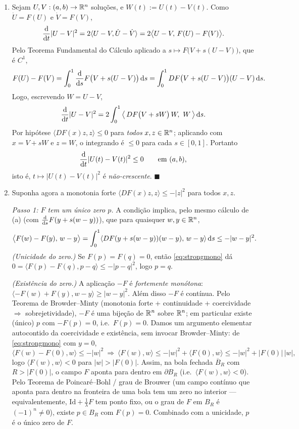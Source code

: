 \begin{enumerate}[label=(\alph*)]

\item Sejam $U,V:(a,b)\to\mathbb{R}^n$ soluções, e $W(t):=U(t)-V(t)$. Como $\dot U=F(U)$ e $\dot V=F(V)$,
\[
\frac{\mathrm{d}}{\mathrm{d} t}|U-V|^2=2\langle U-V,\dot U-\dot V\rangle=2\big\langle U-V,\,F(U)-F(V)\big\rangle .
\]
Pelo Teorema Fundamental do Cálculo aplicado a $s\mapsto F\big(V+s(U-V)\big)$, que é $C^1$,
\[
F(U)-F(V)=\int_0^1 \frac{\mathrm{d}}{\mathrm{d} s}F\big(V+s(U-V)\big)\,\mathrm{d} s=\int_0^1 DF\big(V+s(U-V)\big)(U-V)\,\mathrm{d} s .
\]
Logo, escrevendo $W=U-V$,
\[
\frac{\mathrm{d}}{\mathrm{d} t}|U-V|^2=2\int_0^1 \big\langle\, DF\big(V+sW\big)\,W,\ W\,\big\rangle\,\mathrm{d} s .
\]
Por hipótese $\langle DF(x)z,z\rangle\le0$ para \emph{todos} $x,z\in\mathbb{R}^n$; aplicando com $x=V+sW$ e $z=W$, o integrando é $\le0$ para cada $s\in[0,1]$. Portanto
\[
\frac{\mathrm{d}}{\mathrm{d} t}|U(t)-V(t)|^2\le0\qquad\text{em }(a,b),
\]
isto é, $t\mapsto|U(t)-V(t)|^2$ é \emph{não-crescente}. \qquad$\blacksquare$

\item Suponha agora a monotonia forte $\langle DF(x)z,z\rangle\le-|z|^2$ para todos $x,z$.

\emph{Passo 1: $F$ tem um único zero $p$.}
A condição implica, pelo mesmo cálculo de (a) (com $\frac{\mathrm{d}}{\mathrm{d} s}F(y+s(w-y))$), que para quaisquer $w,y\in\mathbb{R}^n$,
\begin{equation}\label{eq:strongmono}
\big\langle F(w)-F(y),\,w-y\big\rangle=\int_0^1\langle DF(y+s(w-y))(w-y),\,w-y\rangle\,\mathrm{d} s\le -|w-y|^2 .
\end{equation}
\emph{(Unicidade do zero.)} Se $F(p)=F(q)=0$, então \eqref{eq:strongmono} dá $0=\langle F(p)-F(q),p-q\rangle\le -|p-q|^2$, logo $p=q$.

\emph{(Existência do zero.)} A aplicação $-F$ é \emph{fortemente monótona}: $\langle -F(w)+F(y),w-y\rangle\ge|w-y|^2$. Além disso $-F$ é contínua. Pelo Teorema de Browder--Minty (monotonia forte + continuidade + coercividade $\Rightarrow$ sobrejetividade), $-F$ é uma bijeção de $\mathbb{R}^n$ sobre $\mathbb{R}^n$; em particular existe (único) $p$ com $-F(p)=0$, i.e.\ $F(p)=0$. Damos um argumento elementar autocontido da coercividade e existência, sem invocar Browder--Minty: de \eqref{eq:strongmono} com $y=0$,
\[
\langle F(w)-F(0),w\rangle\le-|w|^2\ \Rightarrow\ \langle F(w),w\rangle\le -|w|^2+\langle F(0),w\rangle\le -|w|^2+|F(0)|\,|w|,
\]
logo $\langle F(w),w\rangle<0$ para $|w|>|F(0)|$. Assim, na bola fechada $\overline B_R$ com $R>|F(0)|$, o campo $F$ aponta para dentro em $\partial B_R$ (i.e.\ $\langle F(w),w\rangle<0$). Pelo Teorema de Poincaré--Bohl / grau de Brouwer (um campo contínuo que aponta para dentro na fronteira de uma bola tem um zero no interior --- equivalentemente, $\mathrm{Id}+\tfrac1\lambda F$ tem ponto fixo, ou o grau de $F$ em $B_R$ é $(-1)^n\neq0$), existe $p\in B_R$ com $F(p)=0$. Combinado com a unicidade, $p$ é o único zero de $F$.


\end{enumerate}
